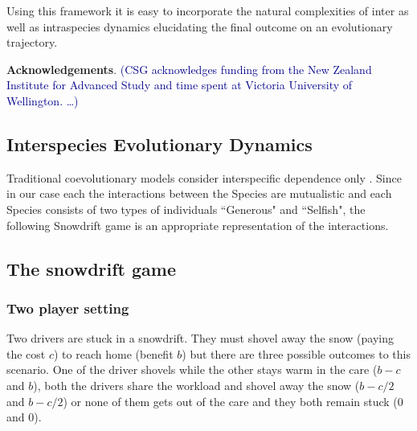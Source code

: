 \documentclass[12pt]{article}
\newcommand{\cha}[1]{\textcolor{darkblue}{(#1)}}
\begin{document}
Using this framework it is easy to incorporate the natural complexities of inter as well as intraspecies dynamics elucidating the final outcome on an evolutionary trajectory.

\textbf{Acknowledgements}. \cha{CSG acknowledges funding from the New Zealand Institute for Advanced Study and time spent at Victoria University of Wellington. \ldots }



%



\renewcommand{\theequation}{A.\arabic{equation}}
\setcounter{equation}{0}

\renewcommand{\thefigure}{A.\arabic{figure}}
\setcounter{figure}{0}

\begin{appendices}

\section{Interspecies Evolutionary Dynamics}

Traditional coevolutionary models consider interspecific dependence only \citep{roughgarden:TPB:1976,roughgarden:book:1983}.
Since in our case each the interactions between the Species are mutualistic and each Species consists of two types of individuals ``Generous" and ``Selfish", the following Snowdrift game is an appropriate representation of the interactions.





\subsection*{The snowdrift game}
\label{appA}
\subsubsection*{Two player setting}
Two drivers are stuck in a snowdrift.
They must shovel away the snow (paying the cost $c$) to reach home (benefit $b$) but there are three possible outcomes to this scenario.
One of the driver shovels while the other stays warm in the care ($b-c$ and $b$), both the drivers share the workload and shovel away the snow ($b-c/2$ and $b-c/2$) or none of them gets out of the care and they both remain stuck ($0$ and $0$).


\end{appendices}
\end{document}
